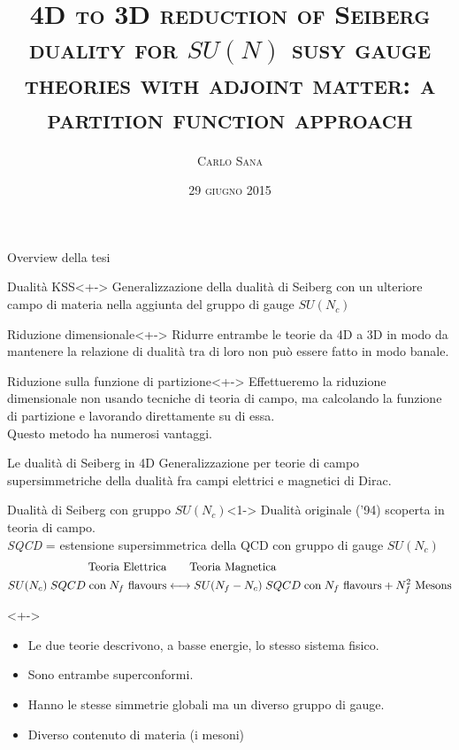 \documentclass[9pt,compress]{beamer}
\date{}
\title{\boldmath \bfseries \scshape 4D to 3D reduction of Seiberg duality for $SU(N)$ susy gauge theories with adjoint matter: a partition function approach}
\author{ \scshape{Carlo Sana} }
\institute{\scshape Università degli Studi di Milano-Bicocca\\
Scuola di Scienze \\
Dipartimento di Fisica G. Occhialini
}
\date{\scshape 29 giugno 2015}
\begin{document}
\frame{\titlepage}

\begin{frame}{Overview della tesi}
\begin{block}{Dualità KSS}<+->
	Generalizzazione della dualità di Seiberg con un ulteriore campo di materia nella aggiunta del gruppo di gauge $SU(N_c)$
\end{block}
\begin{block}{Riduzione dimensionale}<+->
Ridurre entrambe le teorie da 4D a 3D in modo da mantenere la relazione di dualità tra di loro non può essere fatto in modo banale.\\
\end{block}

\begin{block}{Riduzione sulla funzione di partizione}<+->
Effettueremo la riduzione dimensionale non usando tecniche di teoria di campo, ma calcolando la funzione di partizione e lavorando direttamente su di essa.\\
Questo metodo ha numerosi vantaggi.
\end{block}


\end{frame}


\begin{frame}{Le dualità di Seiberg in 4D}
Generalizzazione per teorie di campo supersimmetriche della dualità fra campi elettrici e magnetici di Dirac.\\

\begin{block}{Dualità di Seiberg con gruppo $SU(N_c)$}<1->
Dualità originale ('94) scoperta in teoria di campo.\\
\emph{SQCD} = estensione supersimmetrica della QCD con gruppo di gauge $SU(N_c)$
\begin{equation}
\begin{aligned}
 \hbox{Teoria Elettrica} &\qquad \hbox{Teoria Magnetica}\\
 	 SU(N_c) \; SQCD \; \hbox{con} \; N_f \hbox{ flavours} &\longleftrightarrow SU(N_f - N_c) \; SQCD \;\hbox{con}\; N_f \hbox{ flavours}  + N_f^2 \hbox{ Mesons}\\
\end{aligned}
 \end{equation} 
\end{block}

\begin{block}{}<+->
	\begin{itemize}[<+->]
\item	Le due teorie descrivono, a basse energie, lo stesso sistema fisico.\\
\item	Sono entrambe superconformi.
\item  Hanno le stesse simmetrie globali ma un diverso gruppo di gauge.
\item Diverso contenuto di materia (i mesoni)
	\end{itemize}
	
\end{block}
\end{frame}
\end{document}
